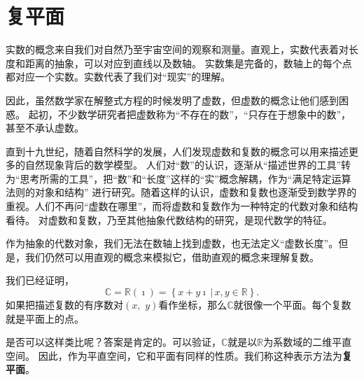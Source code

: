 \documentclass[12pt,UTF8,fontset=none]{ctexbook}
\begin{document}
\section{复平面}

实数的概念来自我们对自然乃至宇宙空间的观察和测量。直观上，实数代表着对长度和距离的抽象，可以对应到直线以及数轴。
实数集是完备的，数轴上的每个点都对应一个实数。实数代表了我们对“现实”的理解。

因此，虽然数学家在解整式方程的时候发明了虚数，但虚数的概念让他们感到困惑。
起初，不少数学研究者把虚数称为“不存在的数”，“只存在于想象中的数”，甚至不承认虚数。

直到十九世纪，随着自然科学的发展，人们发现虚数和复数的概念可以用来描述更多的自然现象背后的数学模型。
人们对“数”的认识，逐渐从“描述世界的工具”转为“思考所需的工具”，把“数”和“长度”这样的“实”概念解耦，作为“满足特定运算法则的对象和结构”
进行研究。随着这样的认识，虚数和复数也逐渐受到数学界的重视。人们不再问“虚数在哪里”，而将虚数和复数作为一种特定的代数对象和结构看待。
对虚数和复数，乃至其他抽象代数结构的研究，是现代数学的特征。

作为抽象的代数对象，我们无法在数轴上找到虚数，也无法定义“虚数长度”。但是，我们仍然可以用直观的概念来模拟它，借助直观的概念来理解复数。

我们已经证明，
$$\mathbb{C} = \mathbb{R}(\imath) = \left\{\left. x + y\imath \, \right| \, x, y \in \mathbb{R} \right\}. $$
如果把描述复数的有序数对$(x,\,\,y)$看作坐标，那么$\mathbb{C}$就很像一个平面。每个复数就是平面上的点。

是否可以这样类比呢？答案是肯定的。可以验证，$\mathbb{C}$就是以$\mathbb{R}$为系数域的二维平直空间。
因此，作为平直空间，它和平面有同样的性质。我们称这种表示方法为\textbf{复平面}。
\end{document}
